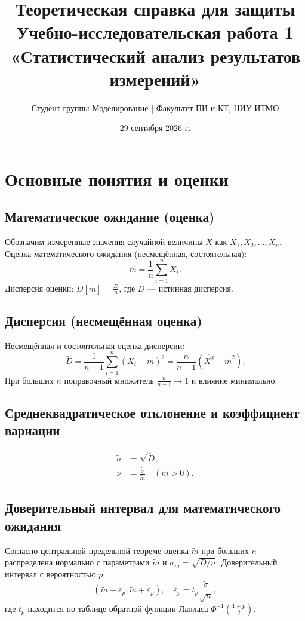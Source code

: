 \documentclass[a4paper,12pt]{article}
\title{Теоретическая справка для защиты\\Учебно-исследовательская работа 1\\«Статистический анализ результатов измерений»}
\author{Студент группы Моделирование | Факультет ПИ и КТ, НИУ ИТМО}
\date{29 сентября 2026 г.}
\begin{document}
\maketitle
\thispagestyle{empty}
\tableofcontents
\newpage

\section{Основные понятия и оценки}

\subsection{Математическое ожидание (оценка)}
Обозначим измеренные значения случайной величины $X$ как $X_1, X_2, \dots, X_n$.
Оценка математического ожидания (несмещённая, состоятельная):
\begin{equation}\label{eq:m}
\tilde{m} = \frac{1}{n}\sum_{i=1}^{n} X_i.
\end{equation}
Дисперсия оценки: $D[\tilde{m}] = \frac{D}{n}$, где $D$ — истинная дисперсия.

\subsection{Дисперсия (несмещённая оценка)}
Несмещённая и состоятельная оценка дисперсии:
\begin{equation}\label{eq:D}
\tilde{D} = \frac{1}{n-1}\sum_{i=1}^{n}(X_i - \tilde{m})^2 = \frac{n}{n-1}\left(\overline{X^2} - \tilde{m}^2\right).
\end{equation}
При больших $n$ поправочный множитель $\frac{n}{n-1} \to 1$ и влияние минимально.

\subsection{Среднеквадратическое отклонение и коэффициент вариации}
\begin{align}
\tilde{\sigma} &= \sqrt{\tilde{D}}, \label{eq:sigma} \\
\nu &= \frac{\tilde{\sigma}}{\tilde{m}} \quad (\tilde{m} > 0). \label{eq:nu}
\end{align}

\subsection{Доверительный интервал для математического ожидания}
Согласно центральной предельной теореме оценка $\tilde{m}$ при больших $n$ распределена нормально с параметрами $\tilde{m}$ и $\sigma_m = \sqrt{D/n}$.
Доверительный интервал с вероятностью $p$:
\begin{equation}
\left(\tilde{m} - \varepsilon_p; \tilde{m} + \varepsilon_p\right), \quad \varepsilon_p = t_p \frac{\tilde{\sigma}}{\sqrt{n}},
\end{equation}
где $t_p$ находится по таблице обратной функции Лапласа $\Phi^{-1}\left(\frac{1+p}{2}\right)$.
\end{document}
